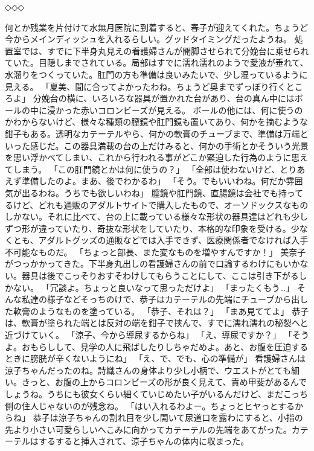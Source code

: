 ◇◇◇

何とか残業を片付けて水無月医院に到着すると、春子が迎えてくれた。ちょうど今からメインディッシュを入れるらしい。グッドタイミングだったようね。
処置室では、すでに下半身丸見えの看護婦さんが開脚させられて分娩台に乗せられていた。目隠しまでされている。局部はすでに濡れ濡れのようで愛液が垂れて、水溜りをつくっていた。肛門の方も準備は良いみたいで、少し湿っているように見える。
「夏美、間に合ってよかったわね。ちょうど奥までずっぽり行くところよ」
分娩台の横に、いろいろな器具が置かれた台があり、台の真ん中にはボールの中に浸かった赤いコロンビーズが見える。
ボールの他には、何に使うのかわからないけど、様々な種類の膣鏡や肛門鏡も置いてあり、何かを摘むような鉗子もある。透明なカテーテルやら、何かの軟膏のチューブまで、準備は万端といった感じだ。この器具満載の台の上だけみると、何かの手術とかそういう光景を思い浮かべてしまい、これから行われる事がどこか緊迫した行為のように思えてしまう。
「この肛門鏡とかは何に使うの？」
「全部は使わないけど、とりあえず準備したのよ。まあ、後でわかるわ」
「そう。でもいいわね。何だか雰囲気が出るわね。うちでも欲しいわね」
膣鏡や肛門鏡、直腸鏡は会社でも持ってるけど、どれも通販のアダルトサイトで購入したもので、オーソドックスなものしかない。それに比べて、台の上に載っている様々な形状の器具達はどれも少しずつ形が違っていたり、奇抜な形状をしていたり、本格的な印象を受ける。少なくとも、アダルトグッズの通販などでは入手できず、医療関係者でなければ入手不可能なものだ。
「ちょっと部長、また変なものを増やすんですか！」
美奈子がつっかかってきた。下半身丸出しの看護婦さんの前で口論するわけにもいかない。器具は後でこっそりおすそわけしてもらうことにして、ここは引き下がるしかない。
「冗談よ。ちょっと良いなって思っただけよ」
「まったくもう…」
そんな私達の様子などそっちのけで、恭子はカテーテルの先端にチューブから出した軟膏のようなものを塗っている。
「恭子、それは？」
「まあ見ててよ」
恭子は、軟膏が塗られた端とは反対の端を鉗子で挟んで、すでに濡れ濡れの秘裂へと近づけていく。
「涼子、今から導尿するからね」
「え、導尿ですか？」
「そうよ。おもらしして、見学の人に飛ばしたりしちゃだめよ。あと、お腹を圧迫するときに膀胱が辛くないようにね」
「え、で、でも、心の準備が」
看護婦さんは涼子ちゃんだったのね。詩織さんの身体より少し小柄で、ウエストがとても細い。きっと、お腹の上からコロンビーズの形が良く見えて、責め甲斐があるんでしょうね。うちにも彼女くらい細くていじめたい子がいるんだけど、まだこっち側の住人じゃないのが残念ね。
「はい入れるわよー。ちょっとヒヤっとするからね」
恭子は涼子ちゃんの割れ目を少し開いて尿道口を露わにすると、小指の先より小さい可愛らしいへこみに向かってカテーテルの先端をあてがった。カテーテルはするすると挿入されて、涼子ちゃんの体内に収まった。
